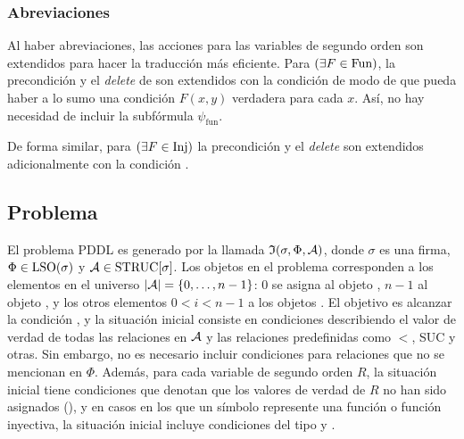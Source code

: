 
\subsubsection{Abreviaciones}
Al haber abreviaciones, las acciones para las variables de segundo orden son
extendidos para hacer la traducción más eficiente. Para $(\exists F\in\text{Fun})$,
la precondición y el \textit{delete} de  son
extendidos con la condición  de modo de que pueda
haber a lo sumo una condición $F(x,y)$ verdadera para cada $x$. Así, no hay
necesidad de incluir la subfórmula $\psi_\text{fun}$. 

De forma similar, para $(\exists F\in\text{Inj})$ la precondición y el
\textit{delete}
son extendidos adicionalmente con la condición .

\subsection{Problema}

\label{traduccionproblema}
El problema PDDL es generado por la llamada $\mathfrak{I}(\sigma,\Phi,\mathcal{A})$, donde
$\sigma$ es una firma, $\Phi\in\text{LSO}(\sigma)$ y $\mathcal{A}\in\text{STRUC}[\sigma]$.
Los objetos en el problema corresponden a los elementos en el universo
$|\mathcal{A}|=\{0,\ldots,n-1\}$: $0$ se asigna al objeto
, $n-1$ al objeto , y los otros elementos
$0<i<n-1$ a los objetos .
El objetivo es alcanzar la condición , y la situación
inicial consiste en condiciones describiendo el valor de verdad de todas las
relaciones en $\mathcal{A}$ y las relaciones predefinidas como $<$, SUC y otras. Sin
embargo, no es necesario incluir condiciones para relaciones que no se
mencionan en $\Phi$. Además, para cada variable de segundo orden $R$, la
situación inicial tiene condiciones que denotan que los valores de verdad de
$R$ no han sido asignados (), y en casos en los que un símbolo
represente una función o función inyectiva, la situación inicial incluye
condiciones del tipo  y .

